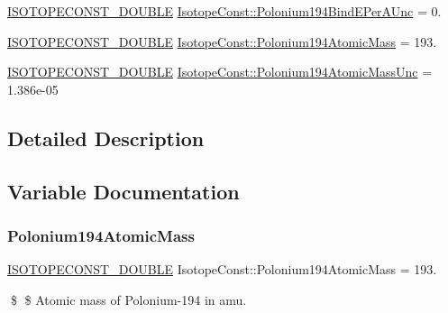\begin{DoxyCompactItemize}
\mbox{\hyperlink{group___isotope_const-_macros_ga8f45a7272ce02c0b4c65c44636ed719a}{I\+S\+O\+T\+O\+P\+E\+C\+O\+N\+S\+T\+\_\+\+D\+O\+U\+B\+LE}} \mbox{\hyperlink{group___isotope_const-_polonium-_po194_gadddab8ca2b6ff8aac8a51aa3b30c8f78}{Isotope\+Const\+::\+Polonium194\+Bind\+E\+Per\+A\+Unc}} = 0.
\item 
\mbox{\hyperlink{group___isotope_const-_macros_ga8f45a7272ce02c0b4c65c44636ed719a}{I\+S\+O\+T\+O\+P\+E\+C\+O\+N\+S\+T\+\_\+\+D\+O\+U\+B\+LE}} \mbox{\hyperlink{group___isotope_const-_polonium-_po194_gab7f66924005124ea62eebbbd13e85594}{Isotope\+Const\+::\+Polonium194\+Atomic\+Mass}} = 193.
\item 
\mbox{\hyperlink{group___isotope_const-_macros_ga8f45a7272ce02c0b4c65c44636ed719a}{I\+S\+O\+T\+O\+P\+E\+C\+O\+N\+S\+T\+\_\+\+D\+O\+U\+B\+LE}} \mbox{\hyperlink{group___isotope_const-_polonium-_po194_ga1f07f159de96629ef83e0efbb1182dd7}{Isotope\+Const\+::\+Polonium194\+Atomic\+Mass\+Unc}} = 1.\+386e-\/05
\end{DoxyCompactItemize}


\subsection{Detailed Description}


\subsection{Variable Documentation}
\mbox{\label{group___isotope_const-_polonium-_po194_gab7f66924005124ea62eebbbd13e85594}} 
\subsubsection{\texorpdfstring{Polonium194\+Atomic\+Mass}{Polonium194AtomicMass}}
{\footnotesize\ttfamily \mbox{\hyperlink{group___isotope_const-_macros_ga8f45a7272ce02c0b4c65c44636ed719a}{I\+S\+O\+T\+O\+P\+E\+C\+O\+N\+S\+T\+\_\+\+D\+O\+U\+B\+LE}} Isotope\+Const\+::\+Polonium194\+Atomic\+Mass = 193.}

\$ \$ Atomic mass of Polonium-\/194 in amu. \mbox{\label{group___isotope_const-_polonium-_po194_ga1f07f159de96629ef83e0efbb1182dd7}} 
